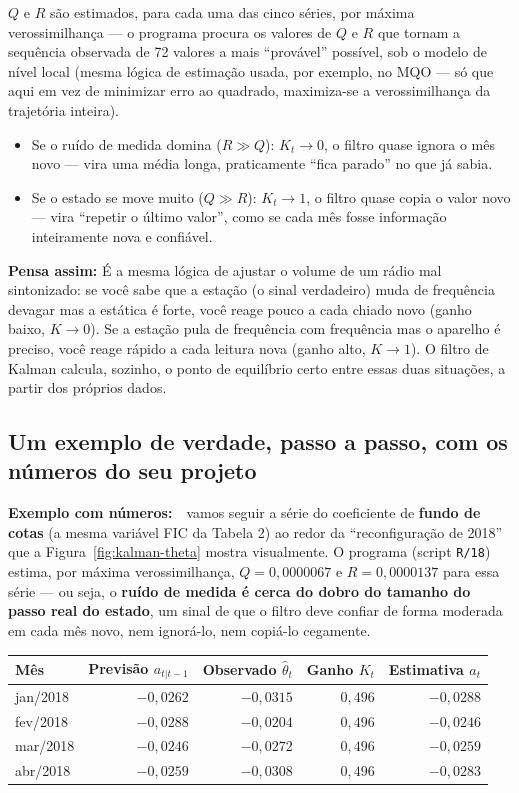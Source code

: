 \documentclass[11pt,a4paper]{article}
\newcommand{\analogia}[1]{\par\vspace{4pt}\noindent\textbf{\color{verde}Pensa assim:} #1\par\vspace{2pt}}
\newcommand{\exemplo}[0]{\par\vspace{4pt}\noindent\textbf{\color{vermelho}Exemplo com números:}\ }
\begin{document}
$Q$ e $R$ são estimados, para cada uma das cinco séries, por máxima verossimilhança --- o
programa procura os valores de $Q$ e $R$ que tornam a sequência observada de 72 valores a mais
``provável'' possível, sob o modelo de nível local (mesma lógica de estimação usada, por
exemplo, no MQO --- só que aqui em vez de minimizar erro ao quadrado, maximiza-se a
verossimilhança da trajetória inteira).

\begin{itemize}[topsep=2pt,itemsep=2pt]
\item Se o ruído de medida domina ($R \gg Q$): $K_t \to 0$, o filtro quase ignora o mês novo ---
vira uma média longa, praticamente ``fica parado'' no que já sabia.
\item Se o estado se move muito ($Q \gg R$): $K_t \to 1$, o filtro quase copia o valor novo ---
vira ``repetir o último valor'', como se cada mês fosse informação inteiramente nova e confiável.
\end{itemize}

\analogia{É a mesma lógica de ajustar o volume de um rádio mal sintonizado: se você sabe que a
estação (o sinal verdadeiro) muda de frequência devagar mas a estática é forte, você reage pouco
a cada chiado novo (ganho baixo, $K\to0$). Se a estação pula de frequência com frequência mas o
aparelho é preciso, você reage rápido a cada leitura nova (ganho alto, $K\to1$). O filtro de
Kalman calcula, sozinho, o ponto de equilíbrio certo entre essas duas situações, a partir dos
próprios dados.}

\subsection{Um exemplo de verdade, passo a passo, com os números do seu projeto}

\exemplo\ vamos seguir a série do coeficiente de \textbf{fundo de cotas} (a mesma variável FIC da
Tabela 2) ao redor da ``reconfiguração de 2018'' que a Figura~\ref{fig:kalman-theta} mostra
visualmente. O programa (script \texttt{R/18}) estima, por máxima verossimilhança, $Q =
0{,}0000067$ e $R = 0{,}0000137$ para essa série --- ou seja, o \textbf{ruído de medida é cerca do
dobro do tamanho do passo real do estado}, um sinal de que o filtro deve confiar de forma
moderada em cada mês novo, nem ignorá-lo, nem copiá-lo cegamente.

\begin{center}\small
\begin{tabular}{@{}lrrrr@{}}
\toprule
Mês & Previsão $a_{t|t-1}$ & Observado $\widehat\theta_t$ & Ganho $K_t$ & Estimativa $a_t$ \\
\midrule
jan/2018 & $-0{,}0262$ & $-0{,}0315$ & $0{,}496$ & $-0{,}0288$ \\
fev/2018 & $-0{,}0288$ & $-0{,}0204$ & $0{,}496$ & $-0{,}0246$ \\
mar/2018 & $-0{,}0246$ & $-0{,}0272$ & $0{,}496$ & $-0{,}0259$ \\
abr/2018 & $-0{,}0259$ & $-0{,}0308$ & $0{,}496$ & $-0{,}0283$ \\
\bottomrule
\end{tabular}
\end{center}
\end{document}
